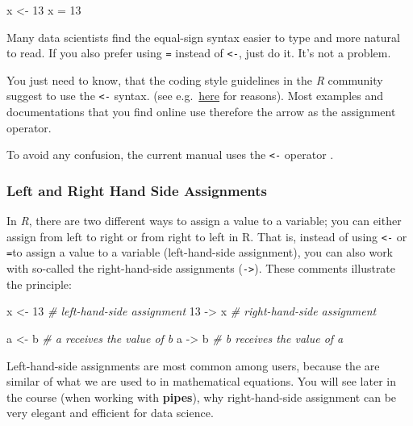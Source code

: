 \documentclass[
]{scrartcl}
\newenvironment{Shaded}{\begin{snugshade}}{\end{snugshade}}
\newcommand{\CommentTok}[1]{\textcolor[rgb]{0.56,0.35,0.01}{\textit{#1}}}
\newcommand{\DecValTok}[1]{\textcolor[rgb]{0.00,0.00,0.81}{#1}}
\newcommand{\NormalTok}[1]{#1}
\newcommand{\OtherTok}[1]{\textcolor[rgb]{0.56,0.35,0.01}{#1}}
\begin{document}
\begin{Shaded}
\begin{Highlighting}[]
\NormalTok{x }\OtherTok{\textless{}{-}} \DecValTok{13}
\NormalTok{x }\OtherTok{=} \DecValTok{13}
\end{Highlighting}
\end{Shaded}

Many data scientists find the equal-sign syntax easier to type and more natural to read. If you also prefer using \texttt{=} instead of \texttt{\textless{}-}, just do it. It's not a problem.

You just need to know, that the coding style guidelines in the \emph{R} community suggest to use the \texttt{\textless{}-} syntax. (see e.g.~\href{https://www.r-bloggers.com/why-do-we-use-arrow-as-an-assignment-operator/}{here} for reasons). Most examples and documentations that you find online use therefore the arrow as the assignment operator.

To avoid any confusion, the current manual uses the \texttt{\textless{}-} operator .

\subsubsection{Left and Right Hand Side Assignments}\label{left-and-right-hand-side-assignments}

In \emph{R}, there are two different ways to assign a value to a variable; you can either assign from left to right or from right to left in R. That is, instead of using \texttt{\textless{}-} or \texttt{=}to assign a value to a variable (left-hand-side assignment), you can also work with so-called the right-hand-side assignments (\texttt{-\textgreater{}}). These comments illustrate the principle:

\begin{Shaded}
\begin{Highlighting}[]
\NormalTok{x }\OtherTok{\textless{}{-}} \DecValTok{13}       \CommentTok{\# left{-}hand{-}side assignment}
\DecValTok{13} \OtherTok{{-}\textgreater{}}\NormalTok{ x       }\CommentTok{\# right{-}hand{-}side assignment}

\NormalTok{a }\OtherTok{\textless{}{-}}\NormalTok{ b        }\CommentTok{\# a receives the value of b}
\NormalTok{a }\OtherTok{{-}\textgreater{}}\NormalTok{ b        }\CommentTok{\# b receives the value of a}
\end{Highlighting}
\end{Shaded}

Left-hand-side assignments are most common among users, because the are similar of what we are used to in mathematical equations. You will see later in the course (when working with \textbf{pipes}), why right-hand-side assignment can be very elegant and efficient for data science.
\end{document}
